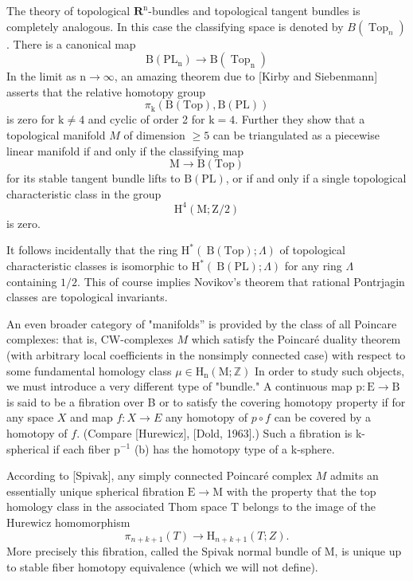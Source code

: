 \documentclass[10pt]{article}
\begin{document}
The theory of topological $\mathbf{R}^{\mathrm{n}}$-bundles and topological tangent bundles is completely analogous. In this case the classifying space is denoted by $B\left(\operatorname{Top}_{n}\right)$. There is a canonical map
$$
\mathrm{B}\left(\mathrm{PL}_{\mathrm{n}}\right) \rightarrow \mathrm{B}\left(\operatorname{Top}_{\mathrm{n}}\right)
$$
In the limit as $\mathrm{n} \rightarrow \infty$, an amazing theorem due to [Kirby and Siebenmann] asserts that the relative homotopy group
$$
\pi_{\mathrm{k}}(\mathrm{B}(\mathrm{Top}), \mathrm{B}(\mathrm{PL}))
$$
is zero for $\mathrm{k} \neq 4$ and cyclic of order 2 for $\mathrm{k}=4$. Further they show that a topological manifold $M$ of dimension $\geq 5$ can be triangulated as a piecewise linear manifold if and only if the classifying map
$$
\mathrm{M} \rightarrow \mathrm{B}(\mathrm{Top})
$$
for its stable tangent bundle lifts to $\mathrm{B}(\mathrm{PL})$, or if and only if a single topological characteristic class in the group
$$
\mathrm{H}^{4}(\mathrm{M} ; \mathrm{Z} / 2)
$$
is zero.

It follows incidentally that the ring $\mathrm{H}^{*}(\mathrm{~B}(\mathrm{Top}) ; \Lambda)$ of topological characteristic classes is isomorphic to $\mathrm{H}^{*}(\mathrm{~B}(\mathrm{PL}) ; \Lambda)$ for any ring $\Lambda$ containing $1 / 2$. This of course implies Novikov's theorem that rational Pontrjagin classes are topological invariants.

An even broader category of "manifolds'' is provided by the class of all Poincare complexes: that is, CW-complexes $M$ which satisfy the Poincaré duality theorem (with arbitrary local coefficients in the nonsimply connected case) with respect to some fundamental homology class $\mu \in \mathrm{H}_{\mathrm{n}}(\mathrm{M} ; \mathbb{Z})$ In order to study such objects, we must introduce a very different type of "bundle." A continuous map $\mathrm{p}: \mathrm{E} \rightarrow \mathrm{B}$ is said to be a fibration over B or to satisfy the covering homotopy property if for any space $X$ and map $f: X \rightarrow E$ any homotopy of $p \circ f$ can be covered by a homotopy of $f$. (Compare [Hurewicz], [Dold, 1963].) Such a fibration is k-spherical if each fiber $\mathrm{p}^{-1}$ (b) has the homotopy type of a k-sphere.

According to [Spivak], any simply connected Poincaré complex $M$ admits an essentially unique spherical fibration $\mathrm{E} \rightarrow \mathrm{M}$ with the property that the top homology class in the associated Thom space $\mathrm{T}$ belongs to the image of the Hurewicz homomorphism
$$
\pi_{n+k+1}(T) \rightarrow \mathrm{H}_{n+k+1}(T ; Z) .
$$
More precisely this fibration, called the Spivak normal bundle of $\mathrm{M}$, is unique up to stable fiber homotopy equivalence (which we will not define).
\end{document}

